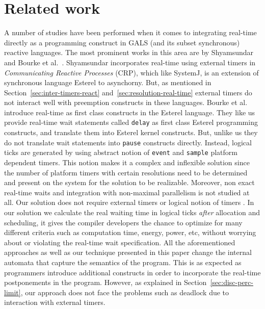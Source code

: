 \section{Related work}
\label{sec:related-work}


A number of studies have been performed when it comes to integrating
real-time directly as a programming construct in GALS (and its subset
synchronous) reactive languages. The most prominent works in this area
are by Shyamsundar~\cite{rsh94} and Bourke et al.~\cite{Bourke2009a}.
Shyamsundar incorporates real-time using external timers in
\textit{Communicating Reactive Processes} (CRP), which like SystemJ, is
an extension of synchronous language Esterel to asynchorny. But, as
mentioned in Section~\ref{sec:inter-timers-react}
and~\ref{sec:resolution-real-time} external timers do not interact well
with preemption constructs in these languages. Bourke et al. introduce
real-time as first class constructs in the Esterel language. They like
us provide real-time wait statements called \texttt{delay} as first
class Esterel programming constructs, and translate them into Esterel
kernel constructs. But, unlike us they do not translate wait statements
into \texttt{pause} constructs directly. Instead, logical ticks are
generated by using abstract notion of \texttt{event} and \texttt{sample}
platform dependent timers. This notion makes it a complex and inflexible
solution since the number of platform timers with certain resolutions
need to be determined and present on the system for the solution to be
realizable. Moreover, non exact real-time waits and integration with
non-maximal parallelism is not studied at all. Our solution does not
require external timers \cite{rsh94} or logical notion of timers
\cite{Bourke2009a}. In our solution we calculate the real waiting time
in logical ticks \textit{after} allocation and scheduling, it gives the
compiler developers the chance to optimize for many different criteria
such as computation time, energy, power, etc, without worrying about or
violating the real-time wait specification. All the aforementioned
approaches \cite{rsh94,Bourke2009a} as well as our technique presented
in this paper cha\-nge the internal automata that capture the semantics
of the program. This is as expected as programmers introduce additional
constructs in order to incorporate the real-time postponements in the
program. However, as explained in Section~\ref{sec:disc-perc-limit}, our
approach does not face the problems such as deadlock due to interaction
with external timers.


